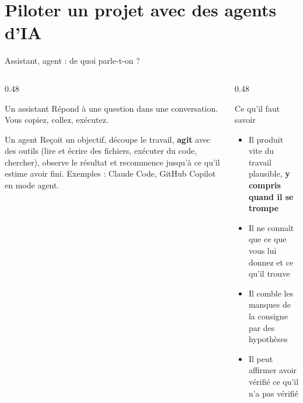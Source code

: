 \documentclass[10pt,aspectratio=169]{beamer}
\begin{document}
\section{Piloter un projet avec des agents d'IA}

\begin{frame}{Assistant, agent : de quoi parle-t-on ?}
\begin{columns}[T]
\begin{column}{0.48\textwidth}
\begin{block}{Un assistant}
Répond à une question dans une conversation. Vous copiez, collez, exécutez.
\end{block}
\begin{block}{Un agent}
Reçoit un objectif, découpe le travail, \textbf{agit} avec des outils (lire et écrire des
fichiers, exécuter du code, chercher), observe le résultat et recommence jusqu'à ce qu'il
estime avoir fini. Exemples : Claude Code, GitHub Copilot en mode agent.
\end{block}
\end{column}
\begin{column}{0.48\textwidth}
\begin{alertblock}{Ce qu'il faut savoir}
\begin{itemize}
  \item Il produit vite du travail plausible, \textbf{y compris quand il se trompe}
  \item Il ne connaît que ce que vous lui donnez et ce qu'il trouve
  \item Il comble les manques de la consigne par des hypothèses
  \item Il peut affirmer avoir vérifié ce qu'il n'a pas vérifié
\end{itemize}
\end{alertblock}
\end{column}
\end{columns}
\end{frame}
\end{document}
